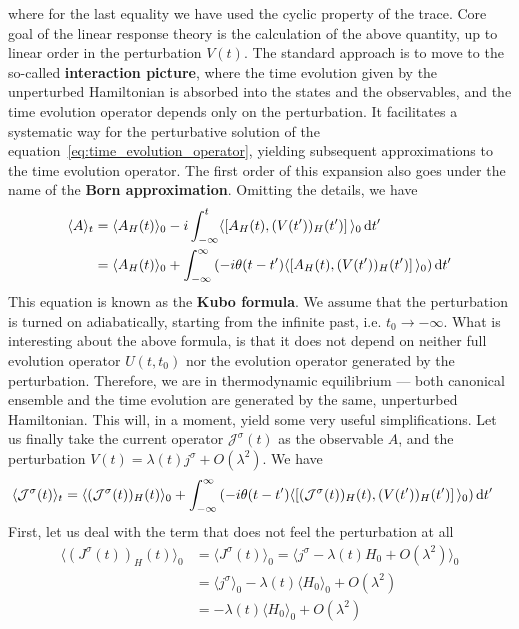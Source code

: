 where for the last equality we have used the cyclic property of the trace. Core goal of the linear response
theory is the calculation of the above quantity, up to linear order in the perturbation \(V(t)\).
The standard approach is to move to the so-called \textbf{interaction picture}, where the time evolution
given by the unperturbed Hamiltonian is absorbed into the states and the observables, and the time evolution
operator depends only on the perturbation. It facilitates a systematic way for the perturbative solution
of the equation~\eqref{eq:time_evolution_operator}, yielding subsequent approximations to the time evolution
operator. The first order of this expansion also goes under the name of the \textbf{Born approximation}.
Omitting the details, we have
\begin{align}
    \langle A \rangle_t & = \langle A_{H}(t) \rangle_0
    - i \int_{-\infty }^{t}  \langle \comm*{A_{H}(t)}
    {(V(t^{\prime} ))_{H}(t^{\prime} )} \rangle_0 \dd{t^{\prime}} \nonumber \\
                        & = \langle A_{H}(t) \rangle_0
    + \int_{-\infty }^{\infty } \left(-i \theta (t-t^{\prime} ) \langle \comm*{A_{H}(t) }
        {(V(t^{\prime} ))_{H}(t^{\prime} )} \rangle_0 \right) \dd{t^{\prime} }
    \label{eq:linear_response}
\end{align}
This equation is known as the \textbf{Kubo formula}. We assume that the perturbation is turned on adiabatically,
starting from the infinite past, i.e. \(t_0 \to -\infty \). What is interesting about the above formula, is that
it does not depend on neither full evolution operator \(U(t,t_0)\) nor the evolution operator
generated by the perturbation. Therefore, we are in thermodynamic equilibrium — both canonical ensemble and
the time evolution are generated by the same, unperturbed Hamiltonian. This will, in a moment, yield some
very useful simplifications.
Let us finally take the current operator \(\mathcal{J}^{\sigma }(t)\) as the observable \(A\), and
the perturbation \(V(t) = \lambda(t) j^{\sigma } + O(\lambda^2)\).
We have
\begin{align}
    \langle \mathcal{J}^{\sigma }(t) \rangle_t & = \langle (\mathcal{J}^{\sigma }(t))_{H}(t) \rangle_0 +
    \int_{-\infty}^{\infty } \left(-i \theta (t-t^{\prime} ) \langle \comm*{(\mathcal{J}^{\sigma }(t))_{H}(t) }
        {(V(t^{\prime} ))_{H}(t^{\prime} )} \rangle_0 \right)\dd{t^{\prime} }
\end{align}
First, let us deal with the term that does not feel the perturbation at all
\begin{align}
    \langle (J^{\sigma }(t))_{H}(t) \rangle_0
     & = \langle J^{\sigma }(t) \rangle_0 =
    \langle j^{\sigma } - \lambda(t)H_0 + O(\lambda ^2) \rangle_0 \nonumber               \\
     & = \langle j^{\sigma } \rangle_0 - \lambda(t) \langle H_0 \rangle_0 + O(\lambda ^2) \\
     & =  -\lambda(t) \langle H_0 \rangle_0 + O(\lambda ^2)
\end{align}
